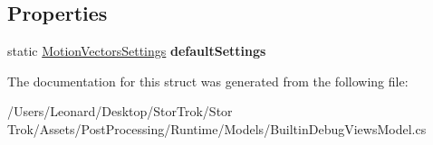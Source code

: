 \subsection*{Properties}
\begin{DoxyCompactItemize}
\item 
\mbox{\label{struct_unity_engine_1_1_post_processing_1_1_builtin_debug_views_model_1_1_motion_vectors_settings_a93b3d0cfc70da4574a94ed0ddd858250}} 
static \hyperlink{struct_unity_engine_1_1_post_processing_1_1_builtin_debug_views_model_1_1_motion_vectors_settings}{Motion\+Vectors\+Settings} {\bfseries default\+Settings}
\end{DoxyCompactItemize}


The documentation for this struct was generated from the following file\+:\begin{DoxyCompactItemize}
\item 
/\+Users/\+Leonard/\+Desktop/\+Stor\+Trok/\+Stor Trok/\+Assets/\+Post\+Processing/\+Runtime/\+Models/Builtin\+Debug\+Views\+Model.\+cs\end{DoxyCompactItemize}
